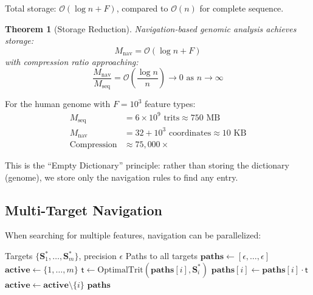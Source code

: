 \documentclass[twocolumn,10pt]{article}
\newtheorem{theorem}{Theorem}[section]
\theoremstyle{remark}
\newcommand{\Scoord}{\mathbf{S}}
\newcommand{\tmark}{\mathsf{t}}
\newcommand{\bigO}{\mathcal{O}}
\begin{document}
Total storage: $\bigO(\log n + F)$, compared to $\bigO(n)$ for complete sequence.

\begin{theorem}[Storage Reduction]
\label{thm:storage}
Navigation-based genomic analysis achieves storage:
\begin{equation}
M_{\text{nav}} = \bigO(\log n + F)
\end{equation}
with compression ratio approaching:
\begin{equation}
\frac{M_{\text{nav}}}{M_{\text{seq}}} = \bigO\left(\frac{\log n}{n}\right) \to 0 \text{ as } n \to \infty
\end{equation}
\end{theorem}

For the human genome with $F = 10^3$ feature types:
\begin{align}
M_{\text{seq}} &= 6 \times 10^9 \text{ trits} \approx 750 \text{ MB} \\
M_{\text{nav}} &= 32 + 10^3 \text{ coordinates} \approx 10 \text{ KB} \\
\text{Compression} &\approx 75,000\times
\end{align}

This is the ``Empty Dictionary'' principle: rather than storing the dictionary (genome), we store only the navigation rules to find any entry.

\subsection{Multi-Target Navigation}

When searching for multiple features, navigation can be parallelized:

\begin{algorithm}
\caption{Parallel Multi-Target Navigation}
\label{alg:multi_nav}
\begin{algorithmic}[1]
\Require Targets $\{\Scoord^*_1, \ldots, \Scoord^*_m\}$, precision $\epsilon$
\Ensure Paths to all targets
\State $\mathbf{paths} \gets [\epsilon, \ldots, \epsilon]$ 
\State $\mathbf{active} \gets \{1, \ldots, m\}$
        \State $\tmark \gets \text{OptimalTrit}(\mathbf{paths}[i], \Scoord^*_i)$
        \State $\mathbf{paths}[i] \gets \mathbf{paths}[i] \cdot \tmark$
        \If{$\|\text{Center}(\mathbf{paths}[i]) - \Scoord^*_i\| < \epsilon$}
            \State $\mathbf{active} \gets \mathbf{active} \setminus \{i\}$
        \EndIf
    \EndFor
\EndWhile
\State \Return $\mathbf{paths}$
\end{algorithmic}
\end{algorithm}
\end{document}

